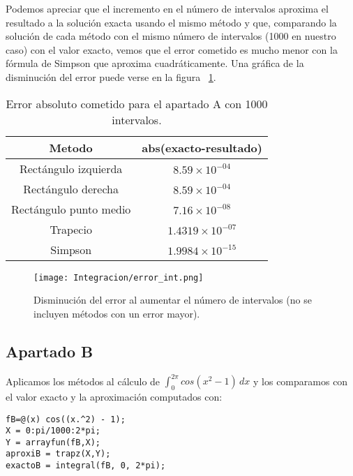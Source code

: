 Podemos apreciar que el incremento en el número de intervalos aproxima el resultado a la solución exacta usando el mismo método y que, comparando la solución de cada método con el mismo número de intervalos (1000 en nuestro caso) con el valor exacto, vemos que el error cometido es mucho menor con la fórmula de Simpson que aproxima cuadráticamente. Una gráfica de la disminución del error puede verse en la figura ~\ref{fig:errorIntA}.
\begin{table}
\begin{center}
\begin{tabular}{ |c|c| } 
 \hline 
 Metodo & abs(exacto-resultado) \\ 
 \hline \hline
 Rectángulo izquierda &  $8.59\times10^{-04}$ \\ 
 \hline
 Rectángulo derecha &  $8.59\times10^{-04}$ \\ 
 \hline
 Rectángulo punto medio &  $7.16\times10^{-08}$ \\ 
 \hline
 Trapecio &  $1.4319\times10^{-07}$ \\ 
 \hline
 Simpson &  $1.9984\times10^{-15}$ \\ 
 \hline
\end{tabular}
\end{center}
\caption{Error absoluto cometido para el apartado A con 1000 intervalos.}
\end{table}

\begin{figure}[!h]
  \centering
  \texttt{[image: Integracion/error\_int.png]}
  \label{fig:errorIntA}
  \caption{Disminución del error al aumentar el número de intervalos (no se incluyen métodos con un error mayor).}
\end{figure}

\subsection{Apartado B}
Aplicamos los métodos al cálculo de \(\int_{0}^{2\pi} cos(x^2 - 1) \,dx\) y los comparamos con el valor exacto y la aproximación computados con:
\begin{lstlisting}
fB=@(x) cos((x.^2) - 1);
X = 0:pi/1000:2*pi;
Y = arrayfun(fB,X);
aproxiB = trapz(X,Y);
exactoB = integral(fB, 0, 2*pi);
\end{lstlisting}

